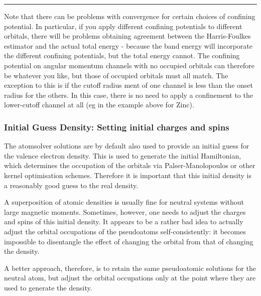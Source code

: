 \documentclass[letterpaper,10pt,english]{sphinxmanual}
\begin{document}
\bigskip\hrule\bigskip





Note that there can be problems with convergence for certain choices of
confining potential. In particular, if you apply different confining
potentials to different  orbitals, there will be problems
obtaining agreement between the Harris-Foulkes estimator and the actual
total energy - because the band energy will incorporate the different
confining potentials, but the total energy cannot. The confining
potential on angular momentum channels with no occupied orbitals can
therefore be whatever you like, but those of occupied orbitals must all
match. The exception to this is if the cutoff radius ment of one channel
is less than the onset radius for the others. In this case, there is no
need to apply a confinement to the lower-cutoff channel at all (eg in
the example above for Zinc).


\subsubsection{Initial Guess Density: Setting initial charges and spins}
\label{\detokenize{pseudoatomic_solver:initial-guess-density-setting-initial-charges-and-spins}}
The atomsolver solutions are by default also used to provide an initial
guess for the valence electron density. This is used to generate the
initial Hamiltonian, which determines the occupation of the orbitals via
Palser-Manolopoulos or other kernel optimisation schemes. Therefore it
is important that this initial density is a reasonably good guess to the
real density.

A superposition of atomic densities is usually fine for neutral systems
without large magnetic moments. Sometimes, however, one needs to adjust
the charges and spins of this initial density. It appears to be a rather
bad idea to actually adjust the orbital occupations of the pseudoatoms
self-consistently: it becomes impossible to disentangle the effect of
changing the orbital from that of changing the density.

A better approach, therefore, is to retain the same pseudoatomic
solutions for the neutral atom, but adjust the orbital occupations only
at the point where they are used to generate the density.
\end{document}

